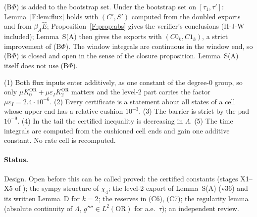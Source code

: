 \documentclass[11pt]{article}
\newcommand{\fn}[1]{\texttt{\detokenize{#1}}}
\newcommand{\OR}{\mathrm{OR}}\newcommand{\eI}{\varepsilon_I}
\begin{document}
\begin{remark}\label{F:rem:boot}
(B$\Phi$) is added to the bootstrap set. Under the bootstrap set on $[\tau_1,\tau']$: Lemma~\ref{F:lem:flux} holds with $(C',S')$ computed from the doubled exports and from $\beta_A\hat E$; Proposition~\ref{F:prop:abs} gives the verifier's conclusions (H-J-W included); Lemma~S(A) then gives the exports with $(C0_k,C1_k)$, a strict improvement of (B$\Phi$). The window integrals are continuous in the window end, so (B$\Phi$) is closed and open in the sense of the closure proposition. Lemma~S(A) itself does not use (B$\Phi$).
\end{remark}

\begin{remark}
(1) Both flux inputs enter additively, as one constant of the degree-0 group, so only $\mu K_0^{\OR}+\mu\eI K_2^{\OR}$ matters and the level-2 part carries the factor $\mu\eI=2.4\cdot10^{-6}$. (2) Every certificate is a statement about all states of a cell whose upper end has a relative cushion $10^{-3}$. (3) The barrier is strict by the pad $10^{-9}$. (4) In the tail the certified inequality is decreasing in $\Lambda$. (5) The time integrals are computed from the cushioned cell ends and gain one additive constant. No rate cell is recomputed.
\end{remark}

\paragraph{Status.} Design. Open before this can be called proved: the certified constants (stages X1--X5 of \fn{FLUX2_DESIGN.md}); the sympy structure of $\chi_4$; the level-2 export of Lemma~S(A) (v36) and its written Lemma~D for $k=2$; the reserves in (C6), (C7); the regularity lemma (absolute continuity of $\Lambda$, $g''''\in L^2(\OR)$ for a.e.\ $\tau$); an independent review.
\end{document}

